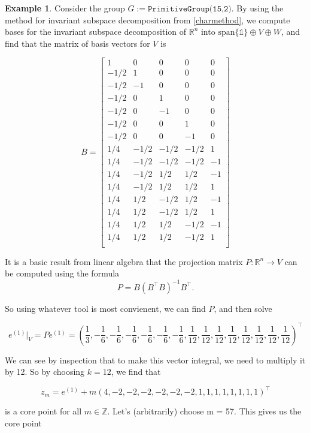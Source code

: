 \documentclass[11pt]{article} %
\theoremstyle{definition}
\newtheorem*{example}{Example}
\theoremstyle{remark}
\newcommand{\ZZ}{\mathbb{Z}}
\newcommand{\RR}{\mathbb{R}}
\newcommand{\code}[1]{\texttt{#1}}
\newcommand{\myspan}[1]{\textrm{span} \lbrace {#1} \rbrace}
\begin{document}
\begin{example}
Consider the group $G := \code{PrimitiveGroup(15,2)}$. By using the method for invariant subspace decomposition from \ref{charmethod}, we compute bases for the invariant subspace decomposition of $\RR^n$ into $\myspan{\mathds{1}} \oplus V \oplus W$, and find that the matrix of basis vectors for $V$ is

\[ B = 
\begin{bmatrix} 1 & 0 & 0 & 0 & 0 \\
-1/2 & 1 & 0 & 0 & 0 \\
-1/2 & -1 & 0 & 0 & 0 \\
-1/2 & 0 & 1 & 0 & 0 \\
-1/2 & 0 & -1 & 0 & 0 \\
-1/2 & 0 & 0 & 1 & 0 \\
-1/2 & 0 & 0 & -1 & 0  \\
1/4 &-1/2 &-1/2 &-1/2 & 1 \\
1/4 &-1/2 &-1/2 &-1/2 & -1 \\
1/4 &-1/2 & 1/2 & 1/2 & -1 \\
1/4 &-1/2 & 1/2 & 1/2 & 1 \\
1/4 & 1/2 &-1/2 & 1/2 & -1 \\
1/4 & 1/2 &-1/2 & 1/2 & 1 \\
1/4 & 1/2 & 1/2 &-1/2 & -1 \\
1/4 & 1/2 & 1/2 &-1/2 & 1 \\
\end{bmatrix} \]

It is a basic result from linear algebra that the projection matrix $P : \RR^n \to V$ can be computed using the formula 
\[ P = B(B^\intercal B)^{-1} B^\intercal .\]

So using whatever tool is most convienent, we can find $P$, and then solve 

\[
e^{(1)}|_V = Pe^{(1)} = \left( \frac{1}{3} , -\frac{1}{6} , -\frac{1}{6} , -\frac{1}{6} , -\frac{1}{6} , -\frac{1}{6} , -\frac{1}{6} , \frac{1}{12} , \frac{1}{12} , \frac{1}{12} , \frac{1}{12} , \frac{1}{12} , \frac{1}{12} , \frac{1}{12} , \frac{1}{12} \right) ^\intercal
\]

We can see by inspection that to make this vector integral, we need to multiply it by 12. So by choosing $k = 12$, we find that

\[ z_m = e^{(1)} + m(4, -2, -2, -2, -2, -2, -2, 1, 1, 1, 1, 1, 1, 1, 1)^\intercal \]

is a core point for all $m \in \ZZ$. Let's (arbitrarily) choose m = 57. This gives us the core point


\end{example}
\end{document}
